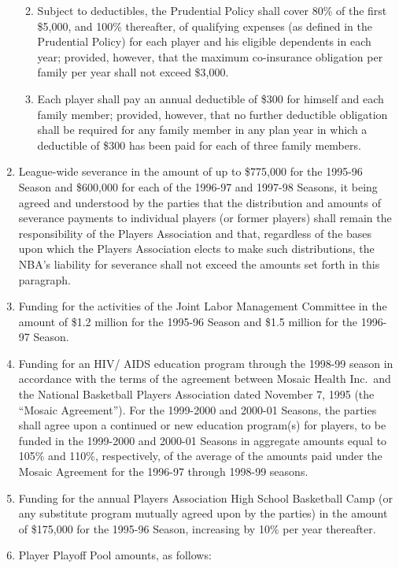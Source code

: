 \documentclass[
]{book}
\providecommand{\tightlist}{%
  \setlength{\itemsep}{0pt}\setlength{\parskip}{0pt}}
\begin{document}
\begin{enumerate}
  \begin{enumerate}
  \def\labelenumii{(\arabic{enumii})}
  \tightlist
  \item
    Subject to deductibles, the Prudential Policy shall cover 80\% of the first \$5,000, and 100\% thereafter, of qualifying expenses (as defined in the Prudential Policy) for each player and his eligible dependents in each year; provided, however, that the maximum co-insurance obligation per family per year shall not exceed \$3,000.
  \item
    Each player shall pay an annual deductible of \$300 for himself and each family member; provided, however, that no further deductible obligation shall be required for any family member in any plan year in which a deductible of \$300 has been paid for each of three family members.
  \end{enumerate}
\item
  League-wide severance in the amount of up to \$775,000 for the 1995-96 Season and \$600,000 for each of the 1996-97 and 1997-98 Seasons, it being agreed and understood by the parties that the distribution and amounts of severance payments to individual players (or former players) shall remain the responsibility of the Players Association and that, regardless of the bases upon which the Players Association elects to make such distributions, the NBA's liability for severance shall not exceed the amounts set forth in this paragraph.
\item
  Funding for the activities of the Joint Labor Management Committee in the amount of \$1.2 million for the 1995-96 Season and \$1.5 million for the 1996-97 Season.
\item
  Funding for an HIV/ AIDS education program through the 1998-99 season in accordance with the terms of the agreement between Mosaic Health Inc.~and the National Basketball Players Association dated November 7, 1995 (the ``Mosaic Agreement''). For the 1999-2000 and 2000-01 Seasons, the parties shall agree upon a continued or new education program(s) for players, to be funded in the 1999-2000 and 2000-01 Seasons in aggregate amounts equal to 105\% and 110\%, respectively, of the average of the amounts paid under the Mosaic Agreement for the 1996-97 through 1998-99 seasons.
\item
  Funding for the annual Players Association High School Basketball Camp (or any substitute program mutually agreed upon by the parties) in the amount of \$175,000 for the 1995-96 Season, increasing by 10\% per year thereafter.
\item
  Player Playoff Pool amounts, as follows:


\end{enumerate}
\end{document}
